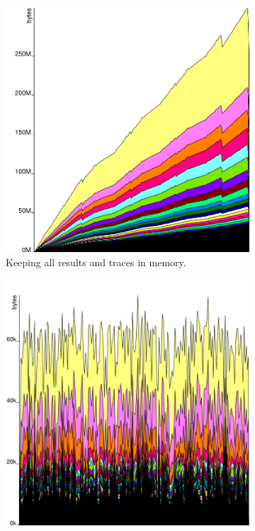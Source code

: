 \begin{figure}
  \centering
  \begin{subfigure}{0.49\textwidth}
    \centering
    \includegraphics[width=\textwidth]{fig/nodiscard.png}
    \caption{Keeping all results and traces in memory.}
  \end{subfigure}
  \begin{subfigure}{0.49\textwidth}
    \centering
    \includegraphics[width=\textwidth]{fig/discard.png}

\end{subfigure}
\end{figure}
